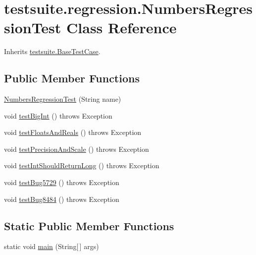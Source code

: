 \hypertarget{classtestsuite_1_1regression_1_1_numbers_regression_test}{}\section{testsuite.\+regression.\+Numbers\+Regression\+Test Class Reference}
\label{classtestsuite_1_1regression_1_1_numbers_regression_test}


Inherits \mbox{\hyperlink{classtestsuite_1_1_base_test_case}{testsuite.\+Base\+Test\+Case}}.

\subsection*{Public Member Functions}
\begin{DoxyCompactItemize}
\item 
\mbox{\hyperlink{classtestsuite_1_1regression_1_1_numbers_regression_test_a4f4ebba6f0961c6042cab7caf78d1247}{Numbers\+Regression\+Test}} (String name)
\item 
void \mbox{\hyperlink{classtestsuite_1_1regression_1_1_numbers_regression_test_a442fb6acce36ae3342c30c04bac684df}{test\+Big\+Int}} ()  throws Exception 
\item 
void \mbox{\hyperlink{classtestsuite_1_1regression_1_1_numbers_regression_test_a1cee824b008e722d36c7d179fb3774d0}{test\+Floats\+And\+Reals}} ()  throws Exception 
\item 
void \mbox{\hyperlink{classtestsuite_1_1regression_1_1_numbers_regression_test_aad8beaba829a493efd49381a817144b9}{test\+Precision\+And\+Scale}} ()  throws Exception 
\item 
void \mbox{\hyperlink{classtestsuite_1_1regression_1_1_numbers_regression_test_ab804942f92985dc6aef8d3c368368e52}{test\+Int\+Should\+Return\+Long}} ()  throws Exception 
\item 
void \mbox{\hyperlink{classtestsuite_1_1regression_1_1_numbers_regression_test_a8b734d31cfe73a510c1e2c9a5f2d049f}{test\+Bug5729}} ()  throws Exception 
\item 
void \mbox{\hyperlink{classtestsuite_1_1regression_1_1_numbers_regression_test_a28ea888d744588001519dd5cafde7074}{test\+Bug8484}} ()  throws Exception 
\end{DoxyCompactItemize}
\subsection*{Static Public Member Functions}
\begin{DoxyCompactItemize}
\item 
static void \mbox{\hyperlink{classtestsuite_1_1regression_1_1_numbers_regression_test_a76a80229b5821f90dff89a1d63388e41}{main}} (String\mbox{[}$\,$\mbox{]} args)
\end{DoxyCompactItemize}
